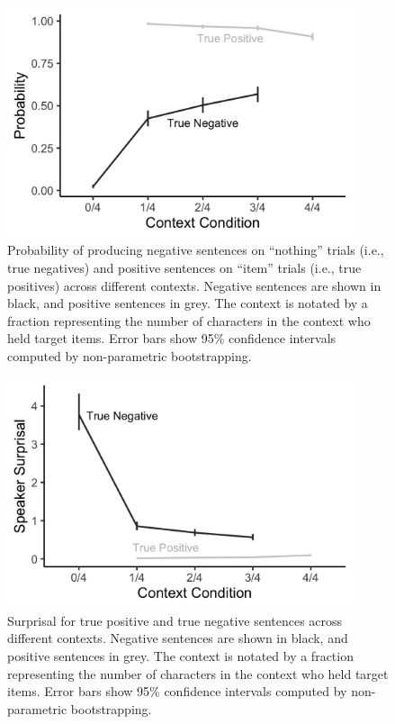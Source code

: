 \documentclass[man, floatsintext, noapacite]{apa6}
\begin{document}
\begin{figure}[t]
\begin{center} 
\includegraphics[width=4in]{figures/experiment1/speaker_probs.png}
\caption{\label{fig:exp1_speakerprobs} Probability of producing negative sentences on ``nothing'' trials (i.e., true negatives) and positive sentences on ``item'' trials (i.e., true positives) across different contexts. Negative sentences are shown in black, and positive sentences in grey.  The context is notated by a fraction representing the number of characters in the context who held target items. Error bars show 95\% confidence intervals computed by non-parametric bootstrapping.  }
\end{center} 
\end{figure}

\begin{figure}[t]
\begin{center} 
\includegraphics[width=4in]{figures/experiment1/speaker_surprisal.png}
\caption{\label{fig:exp1_speakersurprise} Surprisal for true positive and true negative sentences across different contexts. Negative sentences are shown in black, and positive sentences in grey.  The context is notated by a fraction representing the number of characters in the context who held target items. Error bars show 95\% confidence intervals computed by non-parametric bootstrapping.  }
\end{center} 
\end{figure}
\end{document}
